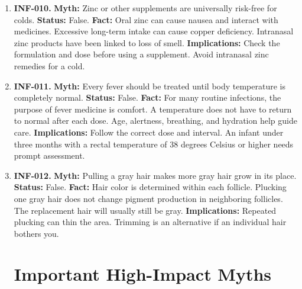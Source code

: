 \documentclass[11pt,oneside]{book}
\begin{document}
\begin{enumerate}[leftmargin=0pt,labelwidth=0pt,labelsep=0pt,itemindent=0pt]
\textbf{Implications:} Check age restrictions and active ingredients. Combining products with the same ingredient, such as acetaminophen, can lead to an overdose.
\item[] \textbf{INF-010.} \textbf{Myth:} Zinc or other supplements are universally risk-free for colds.\newline
\textbf{Status:} False.\newline
\textbf{Fact:} Oral zinc can cause nausea and interact with medicines. Excessive long-term intake can cause copper deficiency. Intranasal zinc products have been linked to loss of smell. \cite{ref195}\newline
\textbf{Implications:} Check the formulation and dose before using a supplement. Avoid intranasal zinc remedies for a cold.
\item[] \textbf{INF-011.} \textbf{Myth:} Every fever should be treated until body temperature is completely normal.\newline
\textbf{Status:} False.\newline
\textbf{Fact:} For many routine infections, the purpose of fever medicine is comfort. A temperature does not have to return to normal after each dose. Age, alertness, breathing, and hydration help guide care. \cite{ref8,ref295}\newline
\textbf{Implications:} Follow the correct dose and interval. An infant under three months with a rectal temperature of 38 degrees Celsius or higher needs prompt assessment.
\item[] \textbf{INF-012.} \textbf{Myth:} Pulling a gray hair makes more gray hair grow in its place.\newline
\textbf{Status:} False.\newline
\textbf{Fact:} Hair color is determined within each follicle. Plucking one gray hair does not change pigment production in neighboring follicles. The replacement hair will usually still be gray. \cite{ref395}\newline
\textbf{Implications:} Repeated plucking can thin the area. Trimming is an alternative if an individual hair bothers you.

\section{Important High-Impact Myths}


\end{enumerate}
\end{document}
